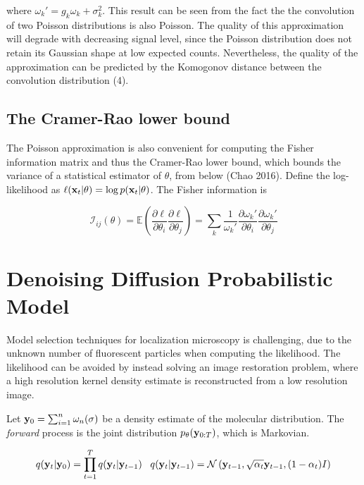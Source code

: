 \documentclass{article}
\begin{document}
where $\omega_{k}' = g_{k}\omega_{k} + \sigma_{k}^{2}$. This result can be seen from the fact the the convolution of two Poisson distributions is also Poisson. The quality of this approximation will degrade with decreasing signal level, since the Poisson distribution does not retain its Gaussian shape at low expected counts. Nevertheless, the quality of the approximation can be predicted by the Komogonov distance between the convolution distribution (4).

\subsection{The Cramer-Rao lower bound}

The Poisson approximation is also convenient for computing the Fisher information matrix and thus the Cramer-Rao lower bound, which bounds the variance of a statistical estimator of $\theta$, from below (Chao 2016). Define the log-likelihood as $\ell (\bold{x}_{t}|\theta) = \log p(\bold{x}_{t}|\theta)$. The Fisher information is

\begin{equation}
\mathcal{I}_{ij}(\theta) = \mathbb{E}\left(\frac{\partial \ell}{\partial\theta_{i}}\frac{\partial\ell}{\partial\theta_{j}}\right) = \sum_{k}\frac{1}{\omega_{k}'}\frac{\partial \omega_{k}'}{\partial\theta_{i}}\frac{\partial \omega_{k}'}{\partial\theta_{j}}
\end{equation}


\section{Denoising Diffusion Probabilistic Model}

Model selection techniques for localization microscopy is challenging, due to the unknown number of fluorescent particles when computing the likelihood. The likelihood can be avoided by instead solving an image restoration problem, where a high resolution kernel density estimate is reconstructed from a low resolution image. 

Let $\bold{y}_{0} = \sum_{i=1}^{n} \bold{\omega}_{n}(\sigma)$ be a density estimate of the molecular distribution. The \emph{forward} process is the joint distribution $p_{\theta}(\bold{y}_{0:T})$, which is Markovian. 

\begin{equation}
q(\bold{y}_{t}|\bold{y}_{0}) = \prod_{t=1}^{T}q(\bold{y}_{t}|\bold{y}_{t-1}) \;\;\; q(\bold{y}_{t}|\bold{y}_{t-1}) = \mathcal{N}\left(\bold{y}_{t-1},\sqrt{\alpha_{t}}\bold{y}_{t-1},(1-\alpha_{t})I\right)
\end{equation}
\end{document}
